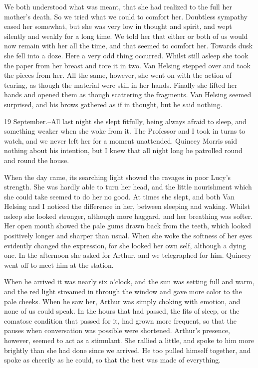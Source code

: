 We both understood what was meant, that she had realized to the full her mother's death. So we tried what we could to comfort her. Doubtless sympathy eased her somewhat, but she was very low in thought and spirit, and wept silently and weakly for a long time. We told her that either or both of us would now remain with her all the time, and that seemed to comfort her. Towards dusk she fell into a doze. Here a very odd thing occurred. Whilst still asleep she took the paper from her breast and tore it in two. Van Helsing stepped over and took the pieces from her. All the same, however, she went on with the action of tearing, as though the material were still in her hands. Finally she lifted her hands and opened them as though scattering the fragments. Van Helsing seemed surprised, and his brows gathered as if in thought, but he said nothing. 

19 September.--All last night she slept fitfully, being always afraid to sleep, and something weaker when she woke from it. The Professor and I took in turns to watch, and we never left her for a moment unattended. Quincey Morris said nothing about his intention, but I knew that all night long he patrolled round and round the house. 

When the day came, its searching light showed the ravages in poor Lucy's strength. She was hardly able to turn her head, and the little nourishment which she could take seemed to do her no good. At times she slept, and both Van Helsing and I noticed the difference in her, between sleeping and waking. Whilst asleep she looked stronger, although more haggard, and her breathing was softer. Her open mouth showed the pale gums drawn back from the teeth, which looked positively longer and sharper than usual. When she woke the softness of her eyes evidently changed the expression, for she looked her own self, although a dying one. In the afternoon she asked for Arthur, and we telegraphed for him. Quincey went off to meet him at the station. 

When he arrived it was nearly six o'clock, and the sun was setting full and warm, and the red light streamed in through the window and gave more color to the pale cheeks. When he saw her, Arthur was simply choking with emotion, and none of us could speak. In the hours that had passed, the fits of sleep, or the comatose condition that passed for it, had grown more frequent, so that the pauses when conversation was possible were shortened. Arthur's presence, however, seemed to act as a stimulant. She rallied a little, and spoke to him more brightly than she had done since we arrived. He too pulled himself together, and spoke as cheerily as he could, so that the best was made of everything. 

